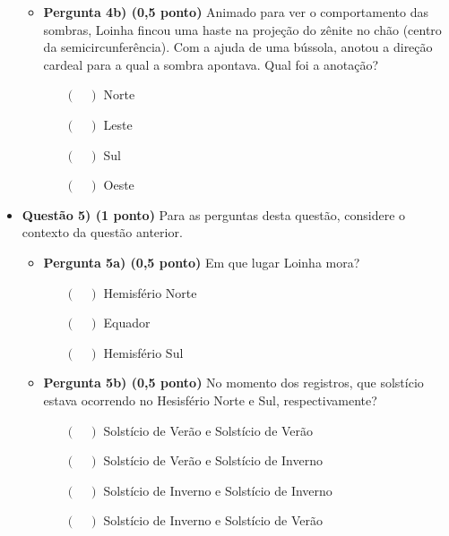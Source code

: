 \documentclass{../lista}
\begin{document}
\begin{itemize}
\begin{itemize}
				\item \textbf{Pergunta 4b) (0,5 ponto)} Animado para ver o comportamento das sombras, Loinha fincou uma haste na projeção do zênite no chão (centro da semicircunferência). Com a ajuda de uma bússola, anotou a direção cardeal para a qual a sombra apontava. Qual foi a anotação?
					\begin{itemize}
						\item[$(\quad)$] Norte
						\item[$(\quad)$] Leste
						\item[$(\quad)$] Sul
						\item[$(\quad)$] Oeste
					\end{itemize} 
			\end{itemize}
		\item \textbf{Questão 5) (1 ponto)} Para as perguntas desta questão, considere o contexto da questão anterior.
			\begin{itemize}
				\item \textbf{Pergunta 5a) (0,5 ponto)} Em que lugar Loinha mora?
					\begin{itemize}
						\item[$(\quad)$] Hemisfério Norte
						\item[$(\quad)$] Equador
						\item[$(\quad)$] Hemisfério Sul
					\end{itemize}
				\item \textbf{Pergunta 5b) (0,5 ponto)} No momento dos registros, que solstício estava ocorrendo no Hesisfério Norte e Sul, respectivamente?
					\begin{itemize}
						\item[$(\quad)$] Solstício de Verão e Solstício de Verão
						\item[$(\quad)$] Solstício de Verão e Solstício de Inverno
						\item[$(\quad)$] Solstício de Inverno e Solstício de Inverno
						\item[$(\quad)$] Solstício de Inverno e Solstício de Verão
					\end{itemize}
			\end{itemize}
	\end{itemize}
\end{document}
